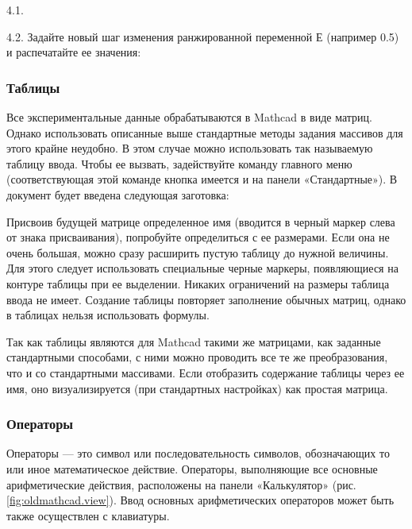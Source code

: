 4.1. 



4.2. Задайте новый шаг изменения ранжированной переменной Е (например 0.5) и распечатайте ее значения:



\subsubsection*{Таблицы}
Все экспериментальные данные обрабатываются в Mathcad в виде матриц. Однако использовать описанные выше стандартные методы задания массивов для этого крайне неудобно. В этом случае можно использовать так называемую таблицу ввода. Чтобы ее вызвать, задействуйте команду  главного меню (соответствующая этой команде кнопка имеется и на панели «Стандартные»). В документ будет введена следующая заготовка:

Присвоив будущей матрице определенное имя (вводится в черный маркер слева от знака присваивания), попробуйте определиться с ее размерами. Если она не очень большая, можно сразу расширить пустую таблицу до нужной величины. Для этого следует использовать специальные черные маркеры, появляющиеся на контуре таблицы при ее выделении. Никаких ограничений на размеры таблица ввода не имеет. Создание таблицы повторяет заполнение обычных матриц, однако в таблицах нельзя использовать формулы.

Так как таблицы являются для Mathcad такими же матрицами, как заданные стандартными способами, с ними можно проводить все те же преобразования, что и со стандартными массивами. Если отобразить содержание таблицы через ее имя, оно визуализируется (при стандартных настройках) как простая матрица.




\subsubsection{Операторы}
Операторы --- это символ или последовательность символов, обозначающих то или иное математическое действие. Операторы, выполняющие все основные арифметические действия, расположены на панели «Калькулятор» (рис. \ref{fig:oldmathcad.view}). Ввод основных арифметических операторов может быть также осуществлен с клавиатуры.

